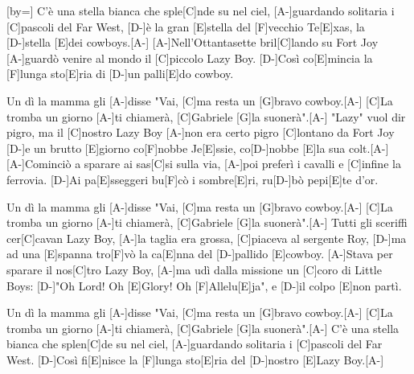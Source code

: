 [by={}]
\beginverse 
[A-]C'è una stella bianca che sple[C]nde su nel ciel,
[A-]guardando solitaria i [C]pascoli del Far West,
[D-]è la gran [E]stella del [F]vecchio Te[E]xas, la [D-]stella [E]dei cowboys.[A-]
[A-]Nell'Ottantasette bril[C]lando su Fort Joy
[A-]guardò venire al mondo il [C]piccolo Lazy Boy.
[D-]Così co[E]mincia la [F]lunga sto[E]ria di [D-]un palli[E]do cowboy. 
\endverse 

\beginchorus  
[C]Un dì la mamma gli [A-]disse "Vai,
[C]ma resta un [G]bravo cowboy.[A-]
[C]La tromba un giorno [A-]ti chiamerà,
[C]Gabriele [G]la suonerà".[A-]
\endchorus
\beginverse 
[A-]"Lazy" vuol dir pigro, ma il [C]nostro Lazy Boy
[A-]non era certo pigro [C]lontano da Fort Joy
[D-]e un brutto [E]giorno co[F]nobbe Je[E]ssie, co[D-]nobbe [E]la sua colt.[A-]
[A-]Cominciò a sparare ai sas[C]si sulla via,
[A-]poi preferì i cavalli e [C]infine la ferrovia.
[D-]Ai pa[E]sseggeri bu[F]cò i sombre[E]ri, ru[D-]bò pepi[E]te d'or. 
\endverse 

\beginchorus  
[C]Un dì la mamma gli [A-]disse "Vai,
[C]ma resta un [G]bravo cowboy.[A-]
[C]La tromba un giorno [A-]ti chiamerà,
[C]Gabriele [G]la suonerà".[A-]
\endchorus
\beginverse 
[A-]Tutti gli sceriffi cer[C]cavan Lazy Boy,
[A-]la taglia era grossa, [C]piaceva al sergente Roy,
[D-]ma ad una [E]spanna tro[F]vò la ca[E]nna del [D-]pallido [E]cowboy.
[A-]Stava per sparare il nos[C]tro Lazy Boy,
[A-]ma udì dalla missione un [C]coro di Little Boys:
[D-]"Oh Lord! Oh [E]Glory! Oh [F]Allelu[E]ja", e [D-]il colpo [E]non partì. 
\endverse 

\beginchorus  
[C]Un dì la mamma gli [A-]disse "Vai,
[C]ma resta un [G]bravo cowboy.[A-]
[C]La tromba un giorno [A-]ti chiamerà,
[C]Gabriele [G]la suonerà".[A-]
\endchorus
\beginverse 
[A-]C'è una stella bianca che splen[C]de su nel ciel,
[A-]guardando solitaria i [C]pascoli del Far West.
[D-]Così fi[E]nisce la [F]lunga sto[E]ria del [D-]nostro [E]Lazy Boy.[A-]
\endverse 
\endsong 

